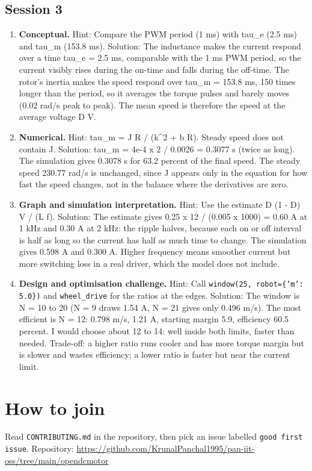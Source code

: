 \documentclass[11pt,a4paper]{article}
\begin{document}
\subsection*{Session 3}
\begin{enumerate}[nosep]
\item \textbf{Conceptual.} Hint: Compare the PWM period (1 ms) with tau\_e (2.5 ms) and tau\_m (153.8 ms). Solution: The inductance makes the current respond over a time tau\_e = 2.5 ms, comparable with the 1 ms PWM period, so the current visibly rises during the on-time and falls during the off-time. The rotor's inertia makes the speed respond over tau\_m = 153.8 ms, 150 times longer than the period, so it averages the torque pulses and barely moves (0.02 rad/s peak to peak). The mean speed is therefore the speed at the average voltage D V.
\item \textbf{Numerical.} Hint: tau\_m = J R / (k\textasciicircum{}2 + b R). Steady speed does not contain J. Solution: tau\_m = 4e-4 x 2 / 0.0026 = 0.3077 s (twice as long). The simulation gives 0.3078 s for 63.2 percent of the final speed. The steady speed 230.77 rad/s is unchanged, since J appears only in the equation for how fast the speed changes, not in the balance where the derivatives are zero.
\item \textbf{Graph and simulation interpretation.} Hint: Use the estimate D (1 - D) V / (L f). Solution: The estimate gives 0.25 x 12 / (0.005 x 1000) = 0.60 A at 1 kHz and 0.30 A at 2 kHz: the ripple halves, because each on or off interval is half as long so the current has half as much time to change. The simulation gives 0.598 A and 0.300 A. Higher frequency means smoother current but more switching loss in a real driver, which the model does not include.
\item \textbf{Design and optimisation challenge.} Hint: Call \texttt{window(25, robot=\{'m': 5.0\})} and \texttt{wheel\_drive} for the ratios at the edges. Solution: The window is N = 10 to 20 (N = 9 draws 1.54 A, N = 21 gives only 0.496 m/s). The most efficient is N = 12: 0.798 m/s, 1.21 A, starting margin 5.9, efficiency 60.5 percent. I would choose about 12 to 14: well inside both limits, faster than needed. Trade-off: a higher ratio runs cooler and has more torque margin but is slower and wastes efficiency; a lower ratio is faster but near the current limit.
\end{enumerate}

\section{How to join}
Read \texttt{CONTRIBUTING.md} in the repository, then pick an issue labelled \texttt{good first issue}. Repository: \url{https://github.com/KrunalPanchal1995/pan-iit-oss/tree/main/opendcmotor}
\end{document}
